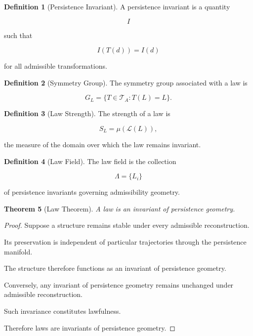 \documentclass[12pt,oneside]{article}
\newtheorem{theorem}{Theorem}[section] \newtheorem{lemma}[theorem]{Lemma} \newtheorem{proposition}[theorem]{Proposition} \newtheorem{corollary}[theorem]{Corollary}
\theoremstyle{definition}
\newtheorem{definition}[theorem]{Definition} \newtheorem{axiom}[theorem]{Axiom} \newtheorem{remark}[theorem]{Remark} \newtheorem{example}[theorem]{Example}
\begin{document}
\begin{definition}[Persistence Invariant]

A persistence invariant is a quantity

\[
I
\]

such that

\[
I(T(d))
=
I(d)
\]

for all admissible transformations.

\end{definition}

\begin{definition}[Symmetry Group]

The symmetry group associated with a law is

\[
G_L
=
\{
T \in \mathcal T_A :
T(L)=L
\}.
\]

\end{definition}

\begin{definition}[Law Strength]

The strength of a law is

\[
S_L
=
\mu(\mathcal L(L)),
\]

the measure of the domain over which the law remains invariant.

\end{definition}

\begin{definition}[Law Field]

The law field is the collection

\[
\Lambda
=
\{L_i\}
\]

of persistence invariants governing admissibility geometry.

\end{definition}

\begin{theorem}[Law Theorem]

A law is an invariant of persistence geometry.

\end{theorem}

\begin{proof}

Suppose a structure remains stable under every admissible reconstruction.

Its preservation is independent of particular trajectories through the persistence manifold.

The structure therefore functions as an invariant of persistence geometry.

Conversely, any invariant of persistence geometry remains unchanged under admissible reconstruction.

Such invariance constitutes lawfulness.

Therefore laws are invariants of persistence geometry.

\end{proof}
\end{document}
